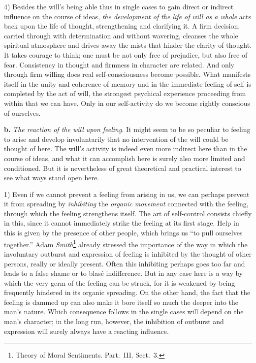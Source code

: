 \documentclass[12pt,a4paper]{book}
\newcommand{\opage}[1]{\marginnote{\footnotesize\textit{[#1]}}}
\begin{document}
\opage{387}4) Besides the will's being able thus in single cases to gain
direct or indirect influence on the course of ideas, \emph{the
development of the life of will as a whole} acts back upon the life of
thought, strengthening and clarifying it. A firm decision, carried
through with determination and without wavering, cleanses the whole
spiritual atmosphere and drives away the mists that hinder the clarity of
thought. It takes courage to think; one must be not only free of
prejudice, but also free of fear. Consistency in thought and firmness in
character are related. And only through firm willing does real
self-consciousness become possible. What manifests itself in the unity
and coherence of memory and in the immediate feeling of self is completed
by the act of will, the strongest psychical experience proceeding from
within that we can have. Only in our self-activity do we become rightly
conscious of ourselves.

\textbf{b.} \emph{The reaction of the will upon feeling}. It might seem
to be so peculiar to feeling to arise and develop involuntarily that no
intervention of the will could be thought of here. The will's activity is
indeed even more indirect here than in the course of ideas, and what it
can accomplish here is surely also more limited and conditioned. But it
is nevertheless of great theoretical and practical interest to see what
ways stand open here.

1) Even if we cannot prevent a feeling from arising in us, we can
perhaps prevent it from spreading by \emph{inhibiting} the \emph{organic
movement} connected with the feeling, through which the feeling
strengthens itself. The art of self-control consists chiefly in this,
since it cannot immediately strike the feeling at its first stage. Help
in this is given by the presence of other people, which brings us ``to
pull ourselves together.'' Adam \emph{Smith}\footnote{Theory of Moral
Sentiments. Part.\ III. Sect.~3.} already stressed the importance of the
way in which the involuntary outburst and expression of feeling is
inhibited by the thought of other persons, really or ideally present.
Often this inhibiting perhaps goes too far and leads to a false shame or
to blasé indifference. But in any case here is a way by which the very
germ of the feeling can be struck, for it is weakened by being frequently
hindered in its organic spreading. On the other hand,
\opage{388}the fact that the feeling is dammed up can also make it bore
itself so much the deeper into the man's nature. Which consequence
follows in the single cases will depend on the man's character; in the
long run, however, the inhibition of outburst and expression will surely
always have a reacting influence.
\end{document}
